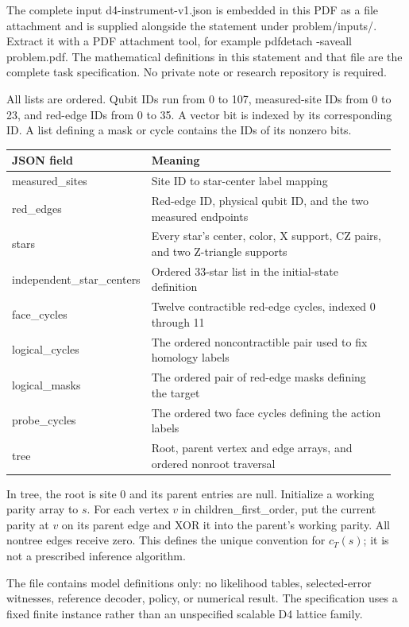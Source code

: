 \documentclass[11pt,letterpaper]{article}
\begin{document}
The complete input {\ttfamily\small d4-instrument-v1.json} is embedded in this PDF as a file attachment and is supplied alongside the statement under {\ttfamily\small problem/inputs/}. Extract it with a PDF attachment tool, for example {\ttfamily\small pdfdetach -saveall problem.pdf}. The mathematical definitions in this statement and that file are the complete task specification. No private note or research repository is required.\par


All lists are ordered. Qubit IDs run from 0 to 107, measured-site IDs from 0 to 23, and red-edge IDs from 0 to 35. A vector bit is indexed by its corresponding ID. A list defining a mask or cycle contains the IDs of its nonzero bits.\par

\begin{longtable}{@{}p{0.29\linewidth}p{0.67\linewidth}@{}}
\toprule \textbf{JSON field} & \textbf{Meaning} \\
\midrule\endhead
{\ttfamily\small measured\_\allowbreak{}sites} & Site ID to star-center label mapping \\[5pt]
{\ttfamily\small red\_\allowbreak{}edges} & Red-edge ID, physical qubit ID, and the two measured endpoints \\[5pt]
{\ttfamily\small stars} & Every star's center, color, X support, CZ pairs, and two Z-triangle supports \\[5pt]
{\ttfamily\small independent\_\allowbreak{}star\_\allowbreak{}centers} & Ordered 33-star list in the initial-state definition \\[5pt]
{\ttfamily\small face\_\allowbreak{}cycles} & Twelve contractible red-edge cycles, indexed 0 through 11 \\[5pt]
{\ttfamily\small logical\_\allowbreak{}cycles} & The ordered noncontractible pair used to fix homology labels \\[5pt]
{\ttfamily\small logical\_\allowbreak{}masks} & The ordered pair of red-edge masks defining the target \\[5pt]
{\ttfamily\small probe\_\allowbreak{}cycles} & The ordered two face cycles defining the action labels \\[5pt]
{\ttfamily\small tree} & Root, parent vertex and edge arrays, and ordered nonroot traversal \\[5pt]
\bottomrule\end{longtable}

In {\ttfamily\small tree}, the root is site 0 and its parent entries are null. Initialize a working parity array to $s$. For each vertex $v$ in {\ttfamily\small children\_\allowbreak{}first\_\allowbreak{}order}, put the current parity at $v$ on its parent edge and XOR it into the parent's working parity. All nontree edges receive zero. This defines the unique convention for $c_T(s)$; it is not a prescribed inference algorithm.\par

The file contains model definitions only: no likelihood tables, selected-error witnesses, reference decoder, policy, or numerical result. The specification uses a fixed finite instance rather than an unspecified scalable D4 lattice family.\par
\end{document}
